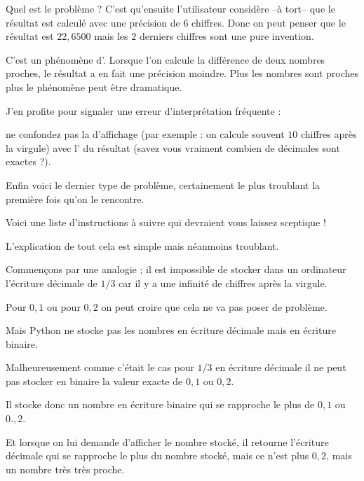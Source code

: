 \change

Quel est le problème ? C'est qu'ensuite l'utilisateur considère --à tort-- que le résultat est 
calculé avec une précision de $6$ chiffres. Donc on peut penser que le résultat est $22,6500$
mais les $2$ derniers chiffres sont une pure invention.

\change



C'est un phénomène d'. Lorsque l'on calcule la différence de deux nombres proches, le résultat
a en fait une précision moindre. Plus les nombres sont proches plus le phénomène peut être 
dramatique.

\change

J'en profite pour signaler une erreur d'interprétation fréquente : 

ne confondez pas la  d'affichage
(par exemple : on calcule souvent $10$ chiffres après la virgule) 
avec l' du résultat 
(savez vous vraiment combien de décimales sont exactes ?).



\diapo

Enfin voici le dernier type de problème, certainement le plus 
troublant la première fois qu'on le rencontre.

Voici une liste d'instructions à suivre qui devraient vous laissez sceptique !


\change


L'explication de tout cela est simple mais néanmoins troublant.

Commençons par une analogie ; il est impossible de stocker dans un ordinateur l'écriture décimale
de $1/3$  car il y a une infinité de chiffres après la virgule.


Pour $0,1$ ou pour $0,2$ on peut croire que cela ne va pas poser de problème.

\change

Mais Python ne stocke pas les nombres en écriture décimale mais en écriture binaire.

Malheureusement comme c'était le cas pour $1/3$ en écriture décimale 
il ne peut pas stocker
en binaire la valeur exacte de $0,1$ ou $0,2$.

\change

Il stocke donc un nombre en écriture binaire qui se 
rapproche le plus de $0,1$ ou $0.,2$.

\change

Et lorsque on lui demande d'afficher
le nombre stocké, il retourne l'écriture décimale qui se rapproche 
le plus du nombre stocké, mais ce n'est plus
$0,2$, mais un nombre très très proche.




